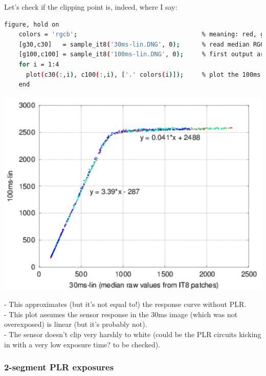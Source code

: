 Let's check if the clipping point is, indeed, where I say: 

\begin{lstlisting}[language=bash,morekeywords=$,keywordstyle=\bfseries,frame=none,xleftmargin=.25in,belowskip=2em, aboveskip=2em]
    figure, hold on
    colors = 'rgcb';                                  % meaning: red, gren1, green2 (plotted as cyan), blue (raw data from Bayer channels)
    [g30,c30]   = sample_it8('30ms-lin.DNG', 0);      % read median RGGB swatch values from IT8 chart
    [g100,c100] = sample_it8('100ms-lin.DNG', 0);     % first output arg is grayscale, second is full color, each column is a Bayer channel
    for i = 1:4
      plot(c30(:,i), c100(:,i), ['.' colors(i)]);     % plot the 100ms image vs the 30ms one (extremely rough guess for response curve)
    end
\end{lstlisting}

\begin{center}
\includegraphics[height=10cm]{images/100ms-vs-30ms-lin}
\end{center}

- This approximates (but it's not equal to!) the response curve without PLR.\\
- This plot assumes the sensor response in the 30ms image (which was not overexposed) is linear (but it's probably not).\\
- The sensor doesn't clip very harshly to white (could be the PLR circuits kicking in with a very low exposure time? to be checked).\\

\subsubsection{2-segment PLR exposures}

